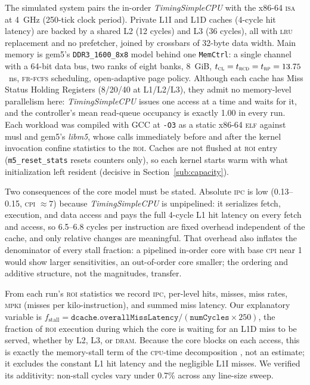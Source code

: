 \documentclass[12pt]{article}
\begin{document}
The simulated system pairs the in-order \textit{TimingSimpleCPU} with the x86-64
\textsc{isa} at 4~GHz (250-tick clock period). Private L1I and L1D caches (4-cycle
hit latency) are backed by a shared L2 (12 cycles) and L3 (36 cycles), all with
\textsc{lru} replacement and no prefetcher, joined by crossbars of 32-byte data
width. Main memory is gem5's \texttt{DDR3\_1600\_8x8} model behind one
\texttt{MemCtrl}: a single channel with a 64-bit data bus, two ranks of eight
banks, 8~GiB, \(t_{\textsc{cl}} = t_{\textsc{rcd}} = t_{\textsc{rp}} = 13.75\)~ns,
\textsc{fr-fcfs} scheduling, open-adaptive page policy. Although each cache has
Miss Status Holding Registers (8/20/40 at L1/L2/L3), they admit no memory-level
parallelism here: \textit{TimingSimpleCPU} issues one access at a time and waits
for it, and the controller's mean read-queue occupancy is exactly 1.00 in every
run. Each workload was compiled with
GCC at \texttt{-O3} as a static x86-64 \textsc{elf} against musl \cite{musl} and
gem5's \textit{libm5}, whose calls immediately before and after the kernel
invocation confine statistics to the \textsc{roi}. Caches are not flushed at
\textsc{roi} entry (\texttt{m5\_reset\_stats} resets counters only), so each kernel
starts warm with what initialization left resident (decisive in
Section~\ref{sub:capacity}).

Two consequences of the core model must be stated. Absolute \textsc{ipc} is low
(0.13--0.15, \textsc{cpi} \(\approx 7\)) because \textit{TimingSimpleCPU} is
unpipelined: it serializes fetch, execution, and data access and pays the full
4-cycle L1 hit latency on every fetch and access, so 6.5--6.8 cycles per
instruction are fixed overhead independent of the cache, and only relative
changes are meaningful. That overhead also inflates the denominator of every
stall fraction: a pipelined in-order core with base \textsc{cpi} near 1 would show
larger sensitivities, an out-of-order core smaller; the ordering and additive
structure, not the magnitudes, transfer.

From each run's \textsc{roi} statistics we record \textsc{ipc}, per-level hits,
misses, miss rates, \textsc{mpki} (misses per kilo-instruction), and summed miss
latency. Our explanatory variable is
\(f_{\text{stall}} = \texttt{dcache.overallMissLatency} / (\texttt{numCycles}
\times 250)\), the fraction of \textsc{roi} execution during which the core is
waiting for an L1D miss to be served, whether by L2, L3, or \textsc{dram}.
Because the core blocks on each access, this is exactly the memory-stall term of
the \textsc{cpu}-time decomposition \cite{hennessy:2017}, not an estimate; it
excludes the constant L1 hit latency and the negligible L1I misses. We verified
its additivity: non-stall cycles vary under 0.7\% across any line-size sweep.
\end{document}
